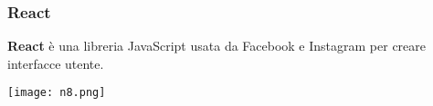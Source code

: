 \begin{frame}
\frametitle{React}
	\par
  	\textbf{React} è una libreria JavaScript usata da Facebook e Instagram per creare interfacce utente.\\
	\begin{flushleft}
		\texttt{[image: n8.png]}
	\end{flushleft}
\end{frame}


